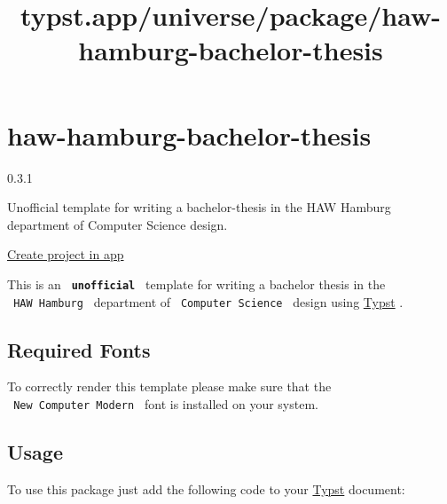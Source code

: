 \title{typst.app/universe/package/haw-hamburg-bachelor-thesis}

\label{banner}
\label{template-thumbnail}

\section{haw-hamburg-bachelor-thesis}\label{haw-hamburg-bachelor-thesis}

{ 0.3.1 }

Unofficial template for writing a bachelor-thesis in the HAW Hamburg
department of Computer Science design.

\href{/app?template=haw-hamburg-bachelor-thesis&version=0.3.1}{Create
project in app}

\label{readme}
This is an \textbf{\texttt{\ unofficial\ }} template for writing a
bachelor thesis in the \texttt{\ HAW\ Hamburg\ } department of
\texttt{\ Computer\ Science\ } design using
\href{https://github.com/typst/typst}{Typst} .

\subsection{Required Fonts}\label{required-fonts}

To correctly render this template please make sure that the
\texttt{\ New\ Computer\ Modern\ } font is installed on your system.

\subsection{Usage}\label{usage}

To use this package just add the following code to your
\href{https://github.com/typst/typst}{Typst} document:

